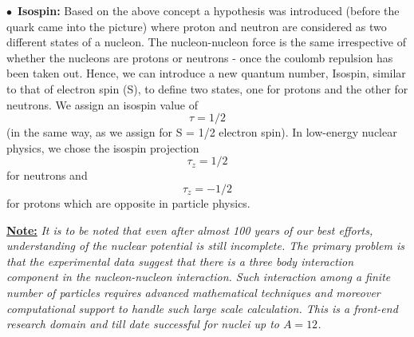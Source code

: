 \par$\bullet$~\textbf{Isospin:} Based on the above concept a hypothesis was introduced (before the quark came into the picture) where proton and neutron are considered as two different states of a nucleon. The nucleon-nucleon force is the same irrespective of whether the nucleons are protons or neutrons - once the coulomb repulsion has been taken out. Hence, we can introduce a new quantum number, Isospin, similar to that of electron spin (S), to define two states, one for protons and the other for neutrons. We assign an isospin value of 
\begin{equation}
   \tau = 1/2
\end{equation}(in the same way, as we assign   for S = 1/2 electron spin). In low-energy nuclear physics, we chose the isospin projection
\begin{equation}
   \tau_z = 1/2
\end{equation}
for neutrons and
\begin{equation}
\tau_z = -1/2
\end{equation}
for protons  which are opposite in particle physics.  

    
\par\textbf{\underline{Note:}} \textit{It is to be noted that even after almost 100 years of our best efforts, understanding of the nuclear potential is still incomplete. The primary problem is that the experimental data suggest that there is a three body interaction component in the nucleon-nucleon interaction. Such interaction among a finite number of particles requires advanced mathematical techniques and moreover computational support to handle such large scale calculation. This is a front-end research domain and till date successful for nuclei up to  $A=12$.}      
      